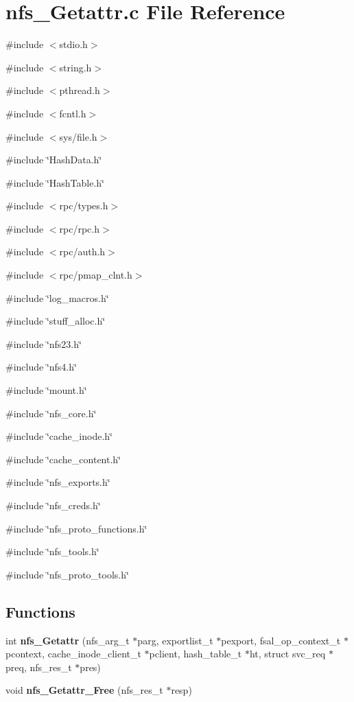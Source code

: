 \section{nfs\_\-Getattr.c File Reference}
\label{nfs__Getattr_8c}
{\ttfamily \#include $<$stdio.h$>$}\par
{\ttfamily \#include $<$string.h$>$}\par
{\ttfamily \#include $<$pthread.h$>$}\par
{\ttfamily \#include $<$fcntl.h$>$}\par
{\ttfamily \#include $<$sys/file.h$>$}\par
{\ttfamily \#include \char`\"{}HashData.h\char`\"{}}\par
{\ttfamily \#include \char`\"{}HashTable.h\char`\"{}}\par
{\ttfamily \#include $<$rpc/types.h$>$}\par
{\ttfamily \#include $<$rpc/rpc.h$>$}\par
{\ttfamily \#include $<$rpc/auth.h$>$}\par
{\ttfamily \#include $<$rpc/pmap\_\-clnt.h$>$}\par
{\ttfamily \#include \char`\"{}log\_\-macros.h\char`\"{}}\par
{\ttfamily \#include \char`\"{}stuff\_\-alloc.h\char`\"{}}\par
{\ttfamily \#include \char`\"{}nfs23.h\char`\"{}}\par
{\ttfamily \#include \char`\"{}nfs4.h\char`\"{}}\par
{\ttfamily \#include \char`\"{}mount.h\char`\"{}}\par
{\ttfamily \#include \char`\"{}nfs\_\-core.h\char`\"{}}\par
{\ttfamily \#include \char`\"{}cache\_\-inode.h\char`\"{}}\par
{\ttfamily \#include \char`\"{}cache\_\-content.h\char`\"{}}\par
{\ttfamily \#include \char`\"{}nfs\_\-exports.h\char`\"{}}\par
{\ttfamily \#include \char`\"{}nfs\_\-creds.h\char`\"{}}\par
{\ttfamily \#include \char`\"{}nfs\_\-proto\_\-functions.h\char`\"{}}\par
{\ttfamily \#include \char`\"{}nfs\_\-tools.h\char`\"{}}\par
{\ttfamily \#include \char`\"{}nfs\_\-proto\_\-tools.h\char`\"{}}\par
\subsection*{Functions}
\begin{DoxyCompactItemize}
\item 
int {\bf nfs\_\-Getattr} (nfs\_\-arg\_\-t $\ast$parg, exportlist\_\-t $\ast$pexport, fsal\_\-op\_\-context\_\-t $\ast$pcontext, cache\_\-inode\_\-client\_\-t $\ast$pclient, hash\_\-table\_\-t $\ast$ht, struct svc\_\-req $\ast$preq, nfs\_\-res\_\-t $\ast$pres)
\item 
void {\bf nfs\_\-Getattr\_\-Free} (nfs\_\-res\_\-t $\ast$resp)
\end{DoxyCompactItemize}


